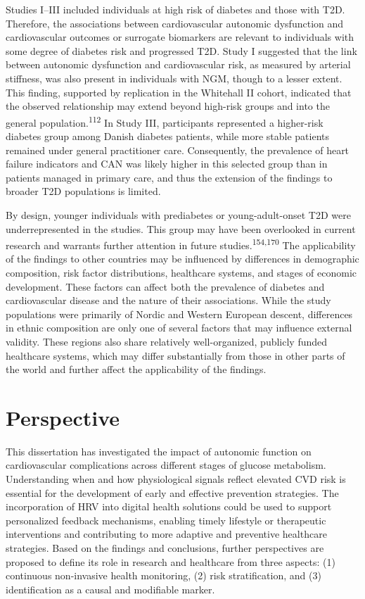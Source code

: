 \documentclass[
  a4paper,
  headsepline=true,
  open=left]{scrbook}
\begin{document}
Studies I--III included individuals at high risk of diabetes and those
with T2D. Therefore, the associations between cardiovascular autonomic
dysfunction and cardiovascular outcomes or surrogate biomarkers are
relevant to individuals with some degree of diabetes risk and progressed
T2D. Study I suggested that the link between autonomic dysfunction and
cardiovascular risk, as measured by arterial stiffness, was also present
in individuals with NGM, though to a lesser extent. This finding,
supported by replication in the Whitehall II cohort, indicated that the
observed relationship may extend beyond high-risk groups and into the
general population.\textsuperscript{112} In Study III, participants
represented a higher-risk diabetes group among Danish diabetes patients,
while more stable patients remained under general practitioner care.
Consequently, the prevalence of heart failure indicators and CAN was
likely higher in this selected group than in patients managed in primary
care, and thus the extension of the findings to broader T2D populations
is limited.

By design, younger individuals with prediabetes or young-adult-onset T2D
were underrepresented in the studies. This group may have been
overlooked in current research and warrants further attention in future
studies.\textsuperscript{154,170} The applicability of the findings to
other countries may be influenced by differences in demographic
composition, risk factor distributions, healthcare systems, and stages
of economic development. These factors can affect both the prevalence of
diabetes and cardiovascular disease and the nature of their
associations. While the study populations were primarily of Nordic and
Western European descent, differences in ethnic composition are only one
of several factors that may influence external validity. These regions
also share relatively well-organized, publicly funded healthcare
systems, which may differ substantially from those in other parts of the
world and further affect the applicability of the findings.


\hypertarget{perspective}{%
\chapter{Perspective}\label{perspective}}

\clearpage
\null
\thispagestyle{empty}
\clearpage

This dissertation has investigated the impact of autonomic function on
cardiovascular complications across different stages of glucose
metabolism. Understanding when and how physiological signals reflect
elevated CVD risk is essential for the development of early and
effective prevention strategies. The incorporation of HRV into digital
health solutions could be used to support personalized feedback
mechanisms, enabling timely lifestyle or therapeutic interventions and
contributing to more adaptive and preventive healthcare strategies.
Based on the findings and conclusions, further perspectives are proposed
to define its role in research and healthcare from three aspects: (1)
continuous non-invasive health monitoring, (2) risk stratification, and
(3) identification as a causal and modifiable marker.
\end{document}
